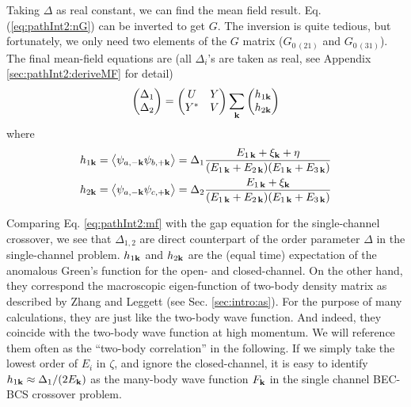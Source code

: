  
 Taking $\Delta$ as real constant,
  we can find the mean field result. Eq. (\ref{eq:pathInt2:nG}) can be inverted to get $G$.  The inversion is quite tedious, but fortunately, we only need two elements of the $G$ matrix ($G_{0\, (21)}$ and $G_{0 \,(31)}$).  The final mean-field equations are (all $\Delta_{i}$'s are taken as real, see Appendix \ref{sec:pathInt2:deriveMF} for detail) 
  \begin{equation}\label{eq:pathInt2:mf}
\begin{pmatrix}\Delta_1\\\Delta_2\end{pmatrix}=\begin{pmatrix}U&Y\\Y^{*}&V\end{pmatrix}\sum_{\mathbf{k}}\begin{pmatrix}h_{1\mathbf{k}}\\h_{2\mathbf{k}}\end{pmatrix}
\end{equation}
  where 
  \begin{gather}
  h_{1\mathbf{k}}=\bigl<{\psi_{a,-{\mathbf{k}}}\psi_{b,+{\mathbf{k}}}}\bigr>
  =\Delta_{1}\frac{E_{1\,\mathbf{k}}+\xi_{\mathbf{k}}+\eta}{(E_{1\,\mathbf{k}}+E_{2\,\mathbf{k}})(E_{1\,\mathbf{k}}+E_{3\,\mathbf{k}})}\label{eq:pathInt2:h1}\\
  h_{2\mathbf{k}}=\bigl<{\psi_{a,-{\mathbf{k}}}\psi_{c,+{\mathbf{k}}}}\bigr>
  =\Delta_{2}\frac{E_{1\,\mathbf{k}}+\xi_{\mathbf{k}}}{(E_{1\,\mathbf{k}}+E_{2\,\mathbf{k}})(E_{1\,\mathbf{k}}+E_{3\,\mathbf{k}})}\label{eq:pathInt2:h2}
  \end{gather}


Comparing Eq. \ref{eq:pathInt2:mf} with the gap equation for the single-channel crossover, we  see that $\Delta_{1,2}$ are  direct counterpart of the order parameter $\Delta$ in the single-channel problem. 
$h_{1\mathbf{k}}$ and $h_{2\mathbf{k}}$ are the (equal time)  expectation of the anomalous Green's function for the open- and closed-channel. On the other hand, they correspond the macroscopic eigen-function of two-body density matrix as described by Zhang and Leggett\cite{ZhangThesis,shizhongUniv} (see Sec. \ref{sec:intro:as}). For the purpose of many calculations, they are just like the two-body wave function. And indeed, they coincide with the two-body wave function at high momentum.  We will reference them often as the ``two-body correlation'' in the following.  
If we simply take the lowest order of $E_{i}$ in $\zeta$, and ignore the closed-channel, it is easy to identify $h_{1\mathbf{k}}\approx{\Delta_{1}}/(2E_{\mathbf{k}})$ as the many-body wave function $F_{\mathbf{k}}$ in the single channel BEC-BCS crossover problem.  


